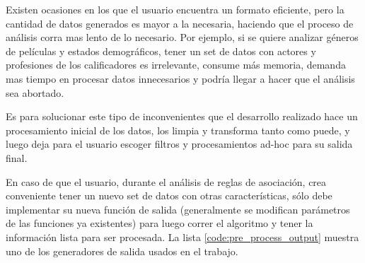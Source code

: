 \documentclass[journal]{IEEEtran}
\begin{document}
Existen ocasiones en los que el usuario encuentra un formato eficiente, pero la cantidad
de datos generados es mayor a la necesaria, haciendo que el proceso de análisis corra
mas lento de lo necesario. Por ejemplo, si se quiere analizar géneros de películas y
estados demográficos, tener un set de datos con actores y profesiones de los calificadores
es irrelevante, consume más memoria, demanda mas tiempo en procesar datos innecesarios
y podría llegar a hacer que el análisis sea abortado.

Es para solucionar este tipo de inconvenientes que el desarrollo realizado hace un
procesamiento inicial de los datos, los limpia y transforma tanto como puede, y luego
deja para el usuario escoger filtros y procesamientos ad-hoc para su salida final.

En caso de que el usuario, durante el análisis de reglas de asociación, crea conveniente
tener un nuevo set de datos con otras características, sólo debe implementar su
nueva función de salida (generalmente se modifican parámetros de las funciones ya
existentes) para luego correr el algoritmo y tener la información lista para ser 
procesada.
La lista \ref{code:pre_process_output} muestra uno de los generadores de salida
usados en el trabajo.
\end{document}
